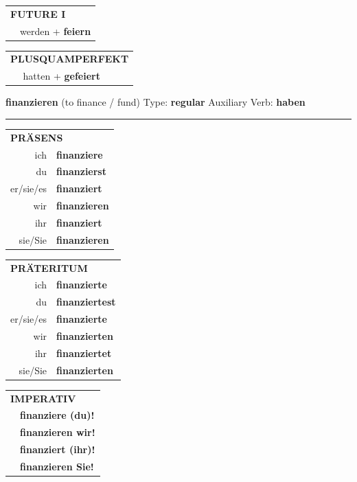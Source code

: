 \documentclass[10pt,a4paper]{revtex4-2}
\begin{document}
\begin{verbbox-acc}
\begin{tabular}{rl}
    \multicolumn{2}{l}{\textbf{FUTURE I} }\\
  &  werden + \textbf{feiern}\\
 
  \end{tabular}
\hfill
   \begin{tabular}{rl}
      \multicolumn{2}{l}{\textbf{PLUSQUAMPERFEKT}}\\
  &  hatten + \textbf{gefeiert}\\
  \end{tabular}
  
  \vspace{-5pt}


\end{verbbox-acc}

\begin{verbbox}
{\Large \bf finanzieren} (to finance / fund) \hfill Type: \textbf{regular} \hfill Auxiliary Verb: \textbf{haben}

\vspace{5pt}
\hrule
\vspace{5pt}

\begin{tabular}{rl}
\multicolumn{2}{l}{\textbf{PRÄSENS}}\\
ich & \textbf{finanziere}\\
du & \textbf{finanzierst}\\
er/sie/es & \textbf{finanziert}\\
wir & \textbf{finanzieren}\\
ihr & \textbf{finanziert}\\
sie/Sie & \textbf{finanzieren}\\
\end{tabular}
\hfill
\begin{tabular}{rl}
\multicolumn{2}{l}{\textbf{PRÄTERITUM}}\\
ich & \textbf{finanzierte}\\
du & \textbf{finanziertest}\\
er/sie/es & \textbf{finanzierte}\\
wir & \textbf{finanzierten}\\
ihr & \textbf{finanziertet}\\
sie/Sie & \textbf{finanzierten}\\
\end{tabular}
\hfill
\begin{tabular}{rl}
\multicolumn{2}{l}{\textbf{IMPERATIV}}\\
& \textbf{finanziere (du)!}\\
& \textbf{finanzieren wir!}\\
& \textbf{finanziert (ihr)!}\\
& \textbf{finanzieren Sie!}\\
\end{tabular}


\end{verbbox}
\end{document}
